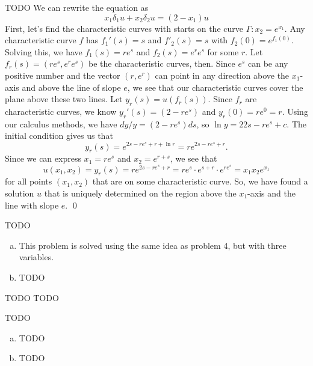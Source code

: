 \documentclass{article}
\renewcommand{\d}{\delta}
\begin{document}
\newpage
{} TODO\tri
\hop
\solution We can rewrite the equation as 
\[x_1\d_1u+x_2\d_2u=(2-x_1)u\]
First, let's find the characteristic curves with starts on the curve $\Gamma: x_2 = e^{x_1}$. Any characteristic curve $f$ has $f_1'(s) = s$ and $f'_2(s) = s$ with $f_2(0)=e^{f_1(0)}$. 
\hop 
Solving this, we have $f_1(s) = re^s$ and $f_2(s) = e^re^s$ for some $r$. Let $f_r(s) = (re^s, e^re^s)$ be the characteristic curves, then. Since $e^s$ can be any positive number and the vector $(r,e^r)$ can point in any direction above the $x_1$-axis and above the line of slope $e$, we see that our characteristic curves cover the plane above these two lines.
\hop %
Let $y_r(s) = u(f_r(s))$. Since $f_r$ are characteristic curves, we know $y_r'(s)=(2-re^s)$ and $y_r(0)=re^0 = r$. Using our calculus methods, we have $dy/y = (2-re^s)ds$, so $\ln y = 22s-re^s+c$. The initial condition gives us that  
\[y_r(s)=e^{2s-re^s+r+\ln r}=re^{2s-re^s+r}.\]
Since we can express $x_1 = re^s$ and $x_2 = e^{r+s}$, we see that 
\[u(x_1,x_2) = y_r(s) = re^{2s-re^s+r} = re^s \cdot e^{s+r}\cdot e^{re^s} = x_1x_2e^{x_1}\]
for all points $(x_1, x_2)$ that are on some characteristic curve. So, we have found a solution $u$ that is uniquely determined on the region above the $x_1$-axis and the line with slope $e$. \qed

\newpage
{} TODO \tri
\hop
\solution
\begin{enumerate}[(a)]
    \item This problem is solved using the same idea as problem 4, but with three variables.
    \item TODO
\end{enumerate}

\newpage
{} TODO \tri
\hop
\solution TODO


\newpage
{} TODO \tri
\hop
\solution
\begin{enumerate}[(a)]
    \item TODO
    \item TODO
\end{enumerate}
\end{document}

